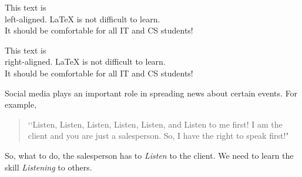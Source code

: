 \documentclass[a4paper]{article}
\begin{document}
\begin{flushleft}
This text is\\ left-aligned.
\LaTeX{} is not difficult to learn. \\
It should be comfortable for all IT and CS students!
\end{flushleft}

\begin{flushright}
This text is\\ right-aligned.
\LaTeX{} is not difficult to learn. \\
It should be comfortable for all IT and CS students!
\end{flushright}

Social media plays an important role in spreading news about certain events. For example,
\begin{quote}
‘‘Listen, Listen, Listen, Listen, Listen, and Listen to me first! I am the client and you are just a salesperson. So, I have the right to speak first!"
\end{quote}
So, what to do, the salesperson has to \emph{Listen} to the client. We need to learn the skill \emph{Listening} to others.
\end{document}
